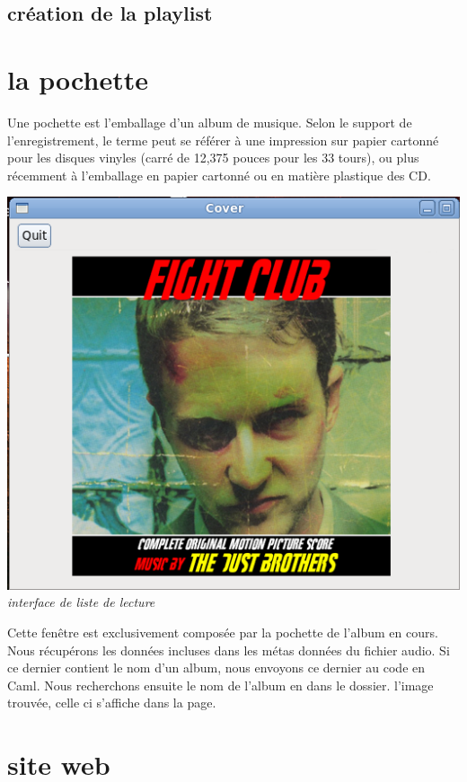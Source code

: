 \documentclass[12pt,a4paper]{report}
\begin{document}
\section{création de la playlist}


\chapter{la pochette}

Une pochette est l'emballage d'un album de musique. Selon le support de l'enregistrement, le terme peut se référer à une impression sur papier cartonné pour les disques vinyles (carré de 12,375 pouces pour les 33 tours), ou plus récemment à l'emballage en papier cartonné ou en matière plastique des CD.

\begin{center}
\includegraphics[scale=0.7]{cover.png}
\it{interface de liste de lecture}
\end{center}

Cette fenêtre est exclusivement composée par la pochette de l'album en cours.
Nous récupérons les données incluses dans les métas données du fichier audio. 
Si ce dernier contient le nom d'un album, nous envoyons ce dernier au code en Caml. 
Nous recherchons ensuite le nom de l'album en dans le dossier. l'image trouvée, celle ci s'affiche dans la page.

\chapter{site web}
\end{document}
